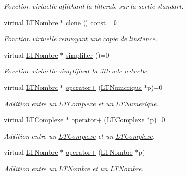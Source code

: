 \begin{DoxyCompactItemize}
\begin{DoxyCompactList}\small\item\em Fonction virtuelle affichant la litterale sur la sortie standart. \end{DoxyCompactList}\item 
virtual \hyperlink{class_l_t_nombre}{L\+T\+Nombre} $\ast$ \hyperlink{class_l_t_nombre_a09ad6faddbb007746e41af6873bd1824}{clone} () const  =0
\begin{DoxyCompactList}\small\item\em Fonction virtuelle renvoyant une copie de l\textquotesingle{}instance. \end{DoxyCompactList}\item 
virtual \hyperlink{class_l_t_nombre}{L\+T\+Nombre} $\ast$ \hyperlink{class_l_t_nombre_a6aa1593c8c0956bb5412bfee3c15b085}{simplifier} ()=0
\begin{DoxyCompactList}\small\item\em Fonction virtuelle simplifiant la litterale actuelle. \end{DoxyCompactList}\item 
virtual \hyperlink{class_l_t_nombre}{L\+T\+Nombre} $\ast$ \hyperlink{class_l_t_nombre_a3962ef35dcfd735800ed5630e55a1d81}{operator+} (\hyperlink{class_l_t_numerique}{L\+T\+Numerique} $\ast$p)=0
\begin{DoxyCompactList}\small\item\em Addition entre un \hyperlink{class_l_t_complexe}{L\+T\+Complexe} et un \hyperlink{class_l_t_numerique}{L\+T\+Numerique}. \end{DoxyCompactList}\item 
virtual \hyperlink{class_l_t_complexe}{L\+T\+Complexe} $\ast$ \hyperlink{class_l_t_nombre_a8caa60dd6bf935dc68e8a37bd527b4d8}{operator+} (\hyperlink{class_l_t_complexe}{L\+T\+Complexe} $\ast$p)=0
\begin{DoxyCompactList}\small\item\em Addition entre un \hyperlink{class_l_t_complexe}{L\+T\+Complexe} et un \hyperlink{class_l_t_complexe}{L\+T\+Complexe}. \end{DoxyCompactList}\item 
virtual \hyperlink{class_l_t_nombre}{L\+T\+Nombre} $\ast$ \hyperlink{class_l_t_nombre_a7a7825bac2fd696259f38018031f01f5}{operator+} (\hyperlink{class_l_t_nombre}{L\+T\+Nombre} $\ast$p)
\begin{DoxyCompactList}\small\item\em Addition entre un \hyperlink{class_l_t_nombre}{L\+T\+Nombre} et un \hyperlink{class_l_t_nombre}{L\+T\+Nombre}. \end{DoxyCompactList}\item 

\end{DoxyCompactItemize}

